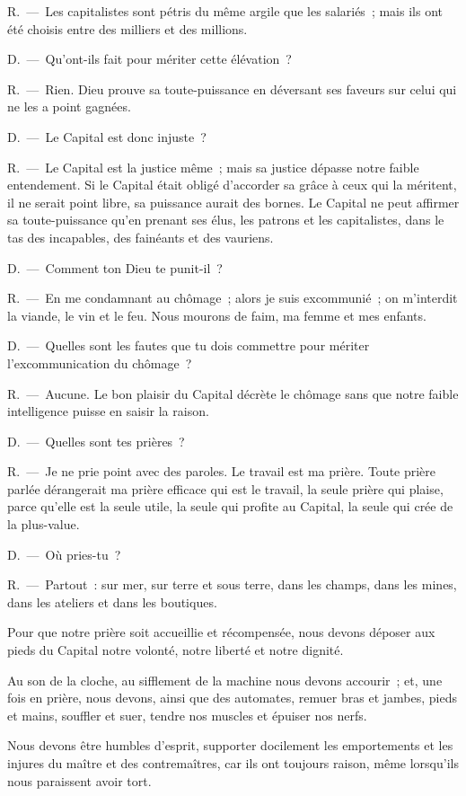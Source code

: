 \documentclass[french,twoside]{book} %
\begin{document}
R. — Les capitalistes sont pétris du même argile que les salariés ; mais ils ont été choisis entre des milliers et des millions.\par
D. — Qu'ont-ils fait pour mériter cette élévation ?\par
R. — Rien. Dieu prouve sa toute-puissance en déversant ses faveurs sur celui qui ne les a point gagnées.\par
D. — Le Capital est donc injuste ?\par
R. — Le Capital est la justice même ; mais sa justice dépasse notre faible entendement. Si le Capital était obligé d’accorder sa grâce à ceux qui la méritent, il ne serait point libre, sa puissance aurait des bornes. Le Capital ne peut affirmer sa toute-puissance qu’en prenant ses élus, les patrons et les capitalistes, dans le tas des incapables, des fainéants et des vauriens.\par
D. — Comment ton Dieu te punit-il ?\par
R. — En me condamnant au chômage ; alors je suis excommunié ; on m’interdit la viande, le vin et le feu. Nous mourons de faim, ma femme et mes enfants.\par
D. — Quelles sont les fautes que tu dois commettre pour mériter l’excommunication du chômage ?\par
R. — Aucune. Le bon plaisir du Capital décrète le chômage sans que notre faible intelligence puisse en saisir la raison.\par
D. — Quelles sont tes prières ?\par
R. — Je ne prie point avec des paroles. Le travail est ma prière. Toute prière parlée dérangerait ma prière efficace qui est le travail, la seule prière qui plaise, parce qu’elle est la seule utile, la seule qui profite au Capital, la seule qui crée de la plus-value.\par
D. — Où pries-tu ?\par
R. — Partout : sur mer, sur terre et sous terre, dans les champs, dans les mines, dans les ateliers et dans les boutiques.\par
Pour que notre prière soit accueillie et récompensée, nous devons déposer aux pieds du Capital notre volonté, notre liberté et notre dignité.\par
Au son de la cloche, au sifflement de la machine nous devons accourir ; et, une fois en prière, nous devons, ainsi que des automates, remuer bras et jambes, pieds et mains, souffler et suer, tendre nos muscles et épuiser nos nerfs.\par
Nous devons être humbles d’esprit, supporter docilement les emportements et les injures du maître et des contremaîtres, car ils ont toujours raison, même lorsqu’ils nous paraissent avoir tort.\par
\end{document}
